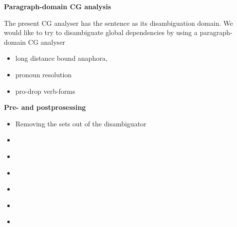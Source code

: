 \documentclass[landscape,english,11pt]{seminar}
\begin{document}
\begin{slide}
\newslide
\textbf{Paragraph-domain CG analysis}

The present CG analyser has the sentence as its disambiguation domain. We would like to try to disambiguate global dependencies by using a paragraph-domain CG analyser

\begin{itemize}
\item long distance bound anaphora, 
\item pronoun resolution 
\item pro-drop verb-forms
\end{itemize}


\newslide
\textbf{Pre- and postprosessing}
\begin{itemize}
\item Removing the sets out of the disambiguator
\item
\end{itemize}


\newslide
\textbf{}
\begin{itemize}
\item
\end{itemize}


\newslide
\textbf{}
\begin{itemize}
\item
\end{itemize}


\newslide
\textbf{}
\begin{itemize}
\item
\end{itemize}


\newslide
\textbf{}
\begin{itemize}
\item
\end{itemize}


\newslide
\textbf{}
\begin{itemize}
\item
\end{itemize}




\end{slide}
\end{document}
